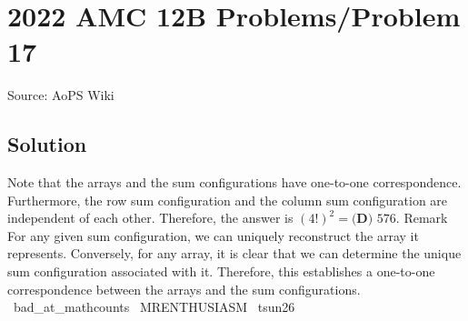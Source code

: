\documentclass[12pt]{article}
\begin{document}
\section*{{2022 AMC 12B Problems/Problem 17}}
Source: AoPS Wiki

\subsection*{Solution}
Note that the arrays and the sum configurations have one-to-one correspondence. Furthermore, the row sum configuration and the column sum configuration are independent of each other. Therefore, the answer is $(4!)^2=\boxed{\textbf{(D) }576}.$ Remark For any given sum configuration, we can uniquely reconstruct the array it represents. Conversely, for any array, it is clear that we can determine the unique sum configuration associated with it. Therefore, this establishes a one-to-one correspondence between the arrays and the sum configurations. ~bad_at_mathcounts ~MRENTHUSIASM ~tsun26
\end{document}
